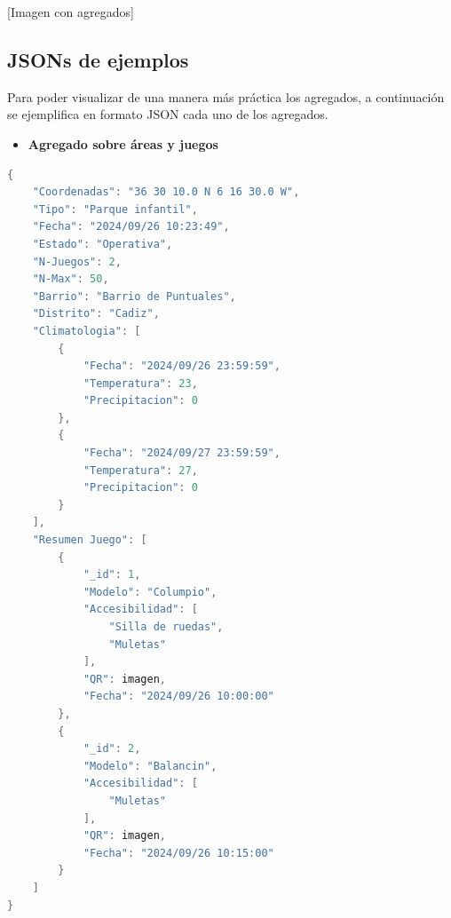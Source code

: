 \documentclass[]{article}
\begin{document}
[Imagen con agregados]

\subsection{JSONs de ejemplos}
\label{sub_sec:json_ejemplos}
Para poder visualizar de una manera más práctica los agregados, a continuación se ejemplifica en formato JSON cada uno de los agregados. 
\begin{itemize}
    \item \textbf{Agregado sobre áreas y juegos}
\end{itemize}
\begin{lstlisting}[caption=Ejemplo de JSON para Agregado sobre Áreas y Juegos, language=C, stringstyle=\color{miverde}]
{
    "Coordenadas": "36 30 10.0 N 6 16 30.0 W",
    "Tipo": "Parque infantil",
    "Fecha": "2024/09/26 10:23:49",
    "Estado": "Operativa",
    "N-Juegos": 2,
    "N-Max": 50,
    "Barrio": "Barrio de Puntuales",
    "Distrito": "Cadiz",
    "Climatologia": [
        {
            "Fecha": "2024/09/26 23:59:59",
            "Temperatura": 23,
            "Precipitacion": 0
        },
        {
            "Fecha": "2024/09/27 23:59:59",
            "Temperatura": 27,
            "Precipitacion": 0
        }
    ],
    "Resumen Juego": [
        {
            "_id": 1,
            "Modelo": "Columpio",
            "Accesibilidad": [
                "Silla de ruedas",
                "Muletas"
            ],
            "QR": imagen,
            "Fecha": "2024/09/26 10:00:00"
        },
        {
            "_id": 2,
            "Modelo": "Balancin",
            "Accesibilidad": [
                "Muletas"
            ],
            "QR": imagen,
            "Fecha": "2024/09/26 10:15:00"
        }
    ]
}
\end{lstlisting}
\end{document}
